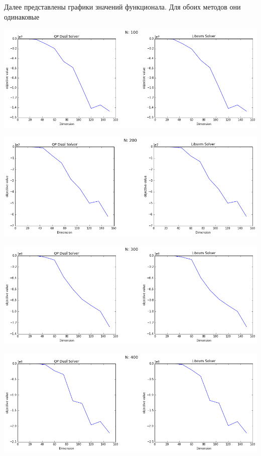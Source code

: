\documentclass[12pt, a4paper]{article}
\begin{document}
			Далее представлены графики значений функционала. Для обоих методов они одинаковые

			\begin{center}
				\includegraphics[width=18cm]{2par_obj_N100.png}
			\end{center}

			\begin{center}
				\includegraphics[width=18cm]{2par_obj_N200.png}
			\end{center}

			\begin{center}
				\includegraphics[width=18cm]{2par_obj_N300.png}
			\end{center}

			\begin{center}
				\includegraphics[width=18cm]{2par_obj_N400.png}
			\end{center}
\end{document}
